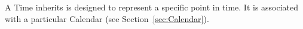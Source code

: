 
A Time inherits is designed to represent a specific point in time.
It is associated with a particular Calendar (see Section~\ref{sec:Calendar}).


